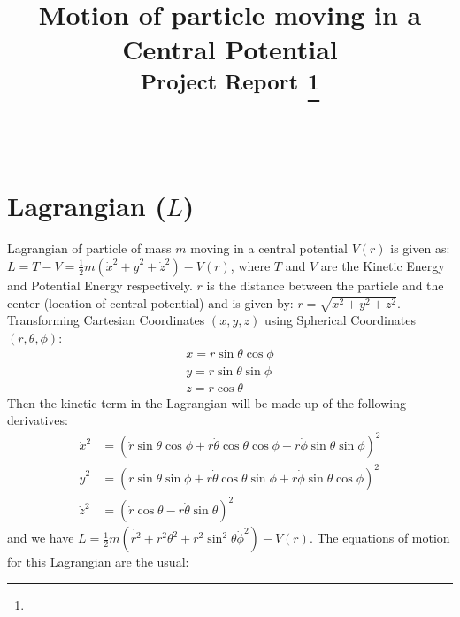 \documentclass[conference]{IEEEtran}
\begin{document}
\title{Motion of particle moving in a Central Potential \\
{\footnotesize \textsuperscript{\LARGE{\textbf{Project Report}}}}
\thanks{}
}

\author{
\IEEEauthorblockN{} \\}

\maketitle

\section{\large{\textbf{Lagrangian ($L$)}}}
Lagrangian of particle of mass $m$ moving in a central potential $V(r)$ is given as: 
$ L = T - V  = \frac{1}{2} m\left(\dot{x}^{2}+\dot{y}^{2}+\dot{z}^{2}\right)-V(r) $, where $T$ and $V$ are the Kinetic Energy and Potential Energy respectively. $r$ is the distance between the particle and the center (location of central potential) and is given by: $r=\sqrt{x^{2}+y^{2}+z^{2}}$. Transforming Cartesian Coordinates $(x,y,z)$ using Spherical Coordinates $(r,\theta,\phi)$:
\begin{equation}
\begin{array}{l}
x=r \sin \theta \cos \phi \\
y=r \sin \theta \sin \phi \\
z=r \cos \theta
\end{array}
\end{equation}
Then the kinetic term in the Lagrangian will be made up of the following derivatives:
\begin{equation}
\begin{aligned}
\dot{x}^{2} &=(\dot{r} \sin \theta \cos \phi+r \dot{\theta} \cos \theta \cos \phi-r \dot{\phi} \sin \theta \sin \phi)^{2} \\
\dot{y}^{2} &=(\dot{r} \sin \theta \sin \phi+r \dot{\theta} \cos \theta \sin \phi+r \dot{\phi} \sin \theta \cos \phi)^{2} \\
\dot{z}^{2} &=(\dot{r} \cos \theta-r \dot{\theta} \sin \theta)^{2}
\end{aligned}
\end{equation}
and we have $L=\frac{1}{2} m\left(\dot{r^{2}}+r^{2} \dot{\theta^{2}}+r^{2} \sin ^{2} \theta{\dot \phi^{2}}\right)-V(r)$. The equations of motion for this Lagrangian are the usual:
\end{document}
